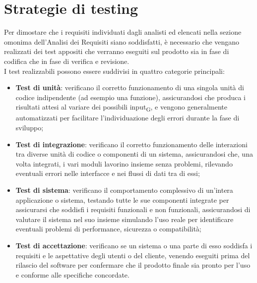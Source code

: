 \section{Strategie di testing}
Per dimostare che i requisiti individuati dagli analisti ed elencati nella sezione omonima dell'Analisi dei Requisiti siano soddisfatti, è necessario che vengano realizzati dei test appositi che verranno eseguiti sul prodotto sia in fase di codifica che in fase di verifica e revisione.\\
I test realizzabili possono essere suddivisi in quattro categorie principali:
\begin{itemize}
    \item \textbf{Test di unità}: verificano il corretto funzionamento di una singola unità di codice indipendente (ad esempio una funzione), assicurandosi che produca i risultati attesi al variare dei possibili input\textsubscript{G}, e vengono generalmente automatizzati per facilitare l'individuazione degli errori durante la fase di sviluppo;
    \item \textbf{Test di integrazione}: verificano il corretto funzionamento delle interazioni tra diverse unità di codice o componenti di un sistema, assicurandosi che, una volta integrati, i vari moduli lavorino insieme senza problemi, rilevando eventuali errori nelle interfacce e nei flussi di dati tra di essi;
    \item \textbf{Test di sistema}: verificano il comportamento complessivo di un'intera applicazione o sistema, testando tutte le sue componenti integrate per assicurarsi che soddisfi i requisiti funzionali e non funzionali, assicurandosi di valutare il sistema nel suo insieme simulando l'uso reale per identificare eventuali problemi di performance, sicurezza o compatibilità;
    \item \textbf{Test di accettazione}: verificano se un sistema o una parte di esso soddisfa i requisiti e le aspettative degli utenti o del cliente, venendo eseguiti prima del rilascio del software per confermare che il prodotto finale sia pronto per l'uso e conforme alle specifiche concordate.
\end{itemize}

